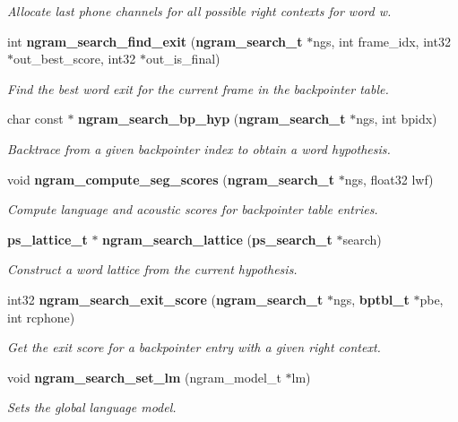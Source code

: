 \begin{DoxyCompactItemize}
\begin{DoxyCompactList}\small\item\em Allocate last phone channels for all possible right contexts for word w. \end{DoxyCompactList}\item 
int {\bf ngram\+\_\+search\+\_\+find\+\_\+exit} ({\bf ngram\+\_\+search\+\_\+t} $\ast$ngs, int frame\+\_\+idx, int32 $\ast$out\+\_\+best\+\_\+score, int32 $\ast$out\+\_\+is\+\_\+final)
\begin{DoxyCompactList}\small\item\em Find the best word exit for the current frame in the backpointer table. \end{DoxyCompactList}\item 
char const $\ast$ {\bf ngram\+\_\+search\+\_\+bp\+\_\+hyp} ({\bf ngram\+\_\+search\+\_\+t} $\ast$ngs, int bpidx)
\begin{DoxyCompactList}\small\item\em Backtrace from a given backpointer index to obtain a word hypothesis. \end{DoxyCompactList}\item 
void {\bf ngram\+\_\+compute\+\_\+seg\+\_\+scores} ({\bf ngram\+\_\+search\+\_\+t} $\ast$ngs, float32 lwf)\label{ngram__search_8h_a2fa760c99f77eb075157304f4359941e}

\begin{DoxyCompactList}\small\item\em Compute language and acoustic scores for backpointer table entries. \end{DoxyCompactList}\item 
{\bf ps\+\_\+lattice\+\_\+t} $\ast$ {\bf ngram\+\_\+search\+\_\+lattice} ({\bf ps\+\_\+search\+\_\+t} $\ast$search)\label{ngram__search_8h_ac30e7dec4bbfeee9f5163abf4bbd1014}

\begin{DoxyCompactList}\small\item\em Construct a word lattice from the current hypothesis. \end{DoxyCompactList}\item 
int32 {\bf ngram\+\_\+search\+\_\+exit\+\_\+score} ({\bf ngram\+\_\+search\+\_\+t} $\ast$ngs, {\bf bptbl\+\_\+t} $\ast$pbe, int rcphone)\label{ngram__search_8h_a25a80e488425b2bd4e24eb753c9295a5}

\begin{DoxyCompactList}\small\item\em Get the exit score for a backpointer entry with a given right context. \end{DoxyCompactList}\item 
void {\bf ngram\+\_\+search\+\_\+set\+\_\+lm} (ngram\+\_\+model\+\_\+t $\ast$lm)
\begin{DoxyCompactList}\small\item\em Sets the global language model. \end{DoxyCompactList}\end{DoxyCompactItemize}


